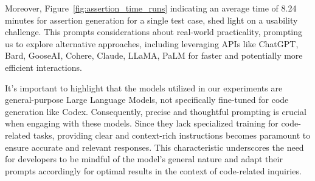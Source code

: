 Moreover, Figure~\ref{fig:assertion_time_runs} indicating an average time of 8.24 minutes for assertion generation for a single test case, shed light on a usability challenge. This prompts considerations about real-world practicality, prompting us to explore alternative approaches, including leveraging APIs like ChatGPT\cite{chatgpt}, Bard\cite{bard}, GooseAI\cite{gooseai}, Cohere\cite{cohere}, Claude\cite{claude}, LLaMA\cite{LLaMA}, PaLM\cite{palm} for faster and potentially more efficient interactions.

It's important to highlight that the models utilized in our experiments are general-purpose Large Language Models, not specifically fine-tuned for code generation like Codex\cite{finnie-ansley_robots_2022}. Consequently, precise and thoughtful prompting is crucial when engaging with these models. Since they lack specialized training for code-related tasks, providing clear and context-rich instructions becomes paramount to ensure accurate and relevant responses. This characteristic underscores the need for developers to be mindful of the model's general nature and adapt their prompts accordingly for optimal results in the context of code-related inquiries.